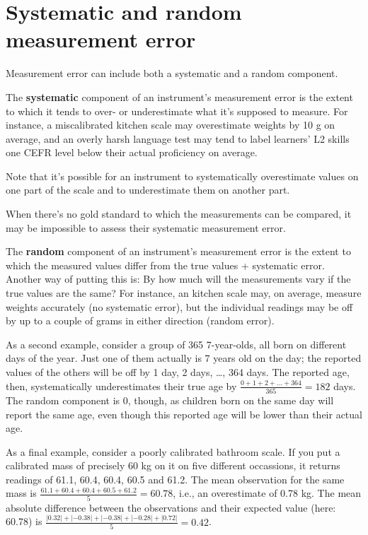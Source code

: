 \documentclass[a4paper]{tufte-book}\usepackage[]{graphicx}\usepackage[]{xcolor}
\newcommand{\term}[1]{\textbf{#1}}
\begin{document}
\section{Systematic and random measurement error}
Measurement error can include both a systematic and a random component.

The \term{systematic} component of an instrument's measurement error is the extent
to which it tends to over- or underestimate what it's supposed to measure.
For instance, a miscalibrated kitchen scale may overestimate weights by 10 g on average,
and an overly harsh language test may tend to label learners' L2 skills
one CEFR level below their actual proficiency on average.

Note that it's possible for an instrument to systematically overestimate
values on one part of the scale and to underestimate them on another part.

When there's no gold standard to which the measurements can be compared,
it may be impossible to assess their systematic measurement error.

The \term{random} component of an instrument's measurement error is the
extent to which the measured values differ from the true values + 
systematic error.
Another way of putting this is: By how much will the
measurements vary if the true values are the same?
For instance, an kitchen scale may, on average, measure weights
accurately (no systematic error), 
but the individual readings may be off by up to a couple of grams 
in either direction (random error).

As a second example, consider a group of 365 7-year-olds, all born
on different days of the year. Just one of them actually is 7 years old
on the day; the reported values of the others will be off by 1 day, 2 days, \dots,
364 days. The reported age, then, systematically underestimates their true age
by $\frac{0+1+2+\dots+364}{365} = 182$ days.
The random component is 0, though, as children born on the same day will report
the same age, even though this reported age will be lower than their actual age.

As a final example, consider a poorly calibrated bathroom scale. If you put
a calibrated mass of precisely 60 kg on it on five different occassions, it returns
readings of 61.1, 60.4, 60.4, 60.5 and 61.2.
The mean observation for the same mass is $\frac{61.1+60.4+60.4+60.5+61.2}{5} = 60.78$,
i.e., an overestimate of 0.78 kg.
The mean absolute difference between the observations and their expected
value (here: 60.78) is $\frac{|0.32| + |-0.38| + |-0.38| + |-0.28| + |0.72|}{5} = 0.42$.
\end{document}
